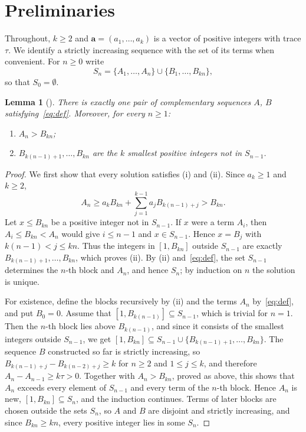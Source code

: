 \documentclass{amsart}
\newtheorem{lemma}[theorem]{Lemma}
\theoremstyle{definition}
\theoremstyle{remark}
\numberwithin{equation}{section}
\numberwithin{table}{section}
\newcommand{\ba}{\mathbf{a}}
\begin{document}
\section{Preliminaries}\label{sec:prelim}

Throughout, $k\ge2$ and $\ba=(a_1,\dots,a_k)$ is a vector of positive integers with trace $\tau$. We identify a strictly increasing sequence with the set of its terms when convenient. For $n\ge0$ write
\[
S_n=\{A_1,\dots,A_n\}\cup\{B_1,\dots,B_{kn}\},
\]
so that $S_0=\emptyset$.

\begin{lemma}[{\cite[Lemma~2]{FJ}}]\label{lem:exist}
There is exactly one pair of complementary sequences $A$, $B$ satisfying~\eqref{eq:def}. Moreover, for every $n\ge1$:
\begin{enumerate}
\item[(i)] $A_n>B_{kn}$;
\item[(ii)] $B_{k(n-1)+1},\dots,B_{kn}$ are the $k$ smallest positive integers not in $S_{n-1}$.
\end{enumerate}
\end{lemma}

\begin{proof}
We first show that every solution satisfies (i) and (ii). Since $a_k\ge1$ and $k\ge2$,
\[
A_n\ge a_kB_{kn}+\sum_{j=1}^{k-1}a_jB_{k(n-1)+j}>B_{kn}.
\]
Let $x\le B_{kn}$ be a positive integer not in $S_{n-1}$. If $x$ were a term $A_i$, then $A_i\le B_{kn}<A_n$ would give $i\le n-1$ and $x\in S_{n-1}$. Hence $x=B_j$ with $k(n-1)<j\le kn$. Thus the integers in $[1,B_{kn}]$ outside $S_{n-1}$ are exactly $B_{k(n-1)+1},\dots,B_{kn}$, which proves (ii). By (ii) and~\eqref{eq:def}, the set $S_{n-1}$ determines the $n$-th block and $A_n$, and hence $S_n$; by induction on $n$ the solution is unique.

For existence, define the blocks recursively by (ii) and the terms $A_n$ by~\eqref{eq:def}, and put $B_0=0$. Assume that $[1,B_{k(n-1)}]\subseteq S_{n-1}$, which is trivial for $n=1$. Then the $n$-th block lies above $B_{k(n-1)}$, and since it consists of the smallest integers outside $S_{n-1}$, we get $[1,B_{kn}]\subseteq S_{n-1}\cup\{B_{k(n-1)+1},\dots,B_{kn}\}$. The sequence $B$ constructed so far is strictly increasing, so $B_{k(n-1)+j}-B_{k(n-2)+j}\ge k$ for $n\ge2$ and $1\le j\le k$, and therefore $A_n-A_{n-1}\ge k\tau>0$. Together with $A_n>B_{kn}$, proved as above, this shows that $A_n$ exceeds every element of $S_{n-1}$ and every term of the $n$-th block. Hence $A_n$ is new, $[1,B_{kn}]\subseteq S_n$, and the induction continues. Terms of later blocks are chosen outside the sets $S_n$, so $A$ and $B$ are disjoint and strictly increasing, and since $B_{kn}\ge kn$, every positive integer lies in some $S_n$.
\end{proof}
\end{document}
